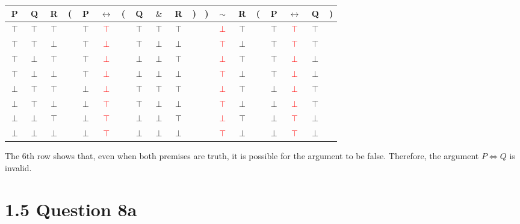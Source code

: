 \documentclass[12pt]{article}
\begin{document}
    \begin{tabular}{ c  c  c | c  c  c  c  c  c  c  c  c | c  c | c  c  c  c  c }
    	P & Q & R & ( & P & $\leftrightarrow$ & ( & Q & $\&$ & R & ) & ) & $\sim$ & R & ( & P & $\leftrightarrow$ & Q & )\\
    	\hline 
    	$\top$ & $\top$ & $\top$ &  & $\top$ & \textcolor{red}{$\top$} &  & $\top$ & $\top$ & $\top$ &  &  & \textcolor{red}{$\perp$} & $\top$ &  & $\top$ & \textcolor{red}{$\top$} & $\top$ & \\
    	$\top$ & $\top$ & $\perp$ &  & $\top$ & \textcolor{red}{$\perp$} &  & $\top$ & $\perp$ & $\perp$ &  &  & \textcolor{red}{$\top$} & $\perp$ &  & $\top$ & \textcolor{red}{$\top$} & $\top$ & \\
    	$\top$ & $\perp$ & $\top$ &  & $\top$ & \textcolor{red}{$\perp$} &  & $\perp$ & $\perp$ & $\top$ &  &  & \textcolor{red}{$\perp$} & $\top$ &  & $\top$ & \textcolor{red}{$\perp$} & $\perp$ & \\
    	$\top$ & $\perp$ & $\perp$ &  & $\top$ & \textcolor{red}{$\perp$} &  & $\perp$ & $\perp$ & $\perp$ &  &  & \textcolor{red}{$\top$} & $\perp$ &  & $\top$ & \textcolor{red}{$\perp$} & $\perp$ & \\
    	$\perp$ & $\top$ & $\top$ &  & $\perp$ & \textcolor{red}{$\perp$} &  & $\top$ & $\top$ & $\top$ &  &  & \textcolor{red}{$\perp$} & $\top$ &  & $\perp$ & \textcolor{red}{$\perp$} & $\top$ & \\
    	$\perp$ & $\top$ & $\perp$ &  & $\perp$ & \textcolor{red}{$\top$} &  & $\top$ & $\perp$ & $\perp$ &  &  & \textcolor{red}{$\top$} & $\perp$ &  & $\perp$ & \textcolor{red}{$\perp$} & $\top$ & \\
    	$\perp$ & $\perp$ & $\top$ &  & $\perp$ & \textcolor{red}{$\top$} &  & $\perp$ & $\perp$ & $\top$ &  &  & \textcolor{red}{$\perp$} & $\top$ &  & $\perp$ & \textcolor{red}{$\top$} & $\perp$ & \\
    	$\perp$ & $\perp$ & $\perp$ &  & $\perp$ & \textcolor{red}{$\top$} &  & $\perp$ & $\perp$ & $\perp$ &  &  & \textcolor{red}{$\top$} & $\perp$ &  & $\perp$ & \textcolor{red}{$\top$} & $\perp$ & \\
    \end{tabular}	
	
	The 6th row shows that, even when both premises are truth, it is possible for the argument to be false. Therefore, the argument $P \iff Q$ is invalid.
	
	\section{1.5 Question 8a}
	
\end{document}
